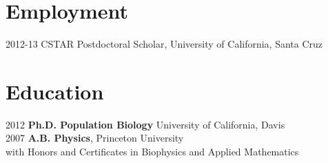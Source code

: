 \documentclass[margin]{res}
\begin{document}
\small
\begin{resume}

\section{Employment}
2012-13 CSTAR Postdoctoral Scholar, University of California, Santa Cruz 

\section{Education}

2012 \textbf{Ph.D. Population Biology} University of California, Davis \\
2007 \textbf{A.B. Physics}, Princeton University \\
{\footnotesize with Honors and Certificates in Biophysics and Applied Mathematics}


\end{resume}
\end{document}
